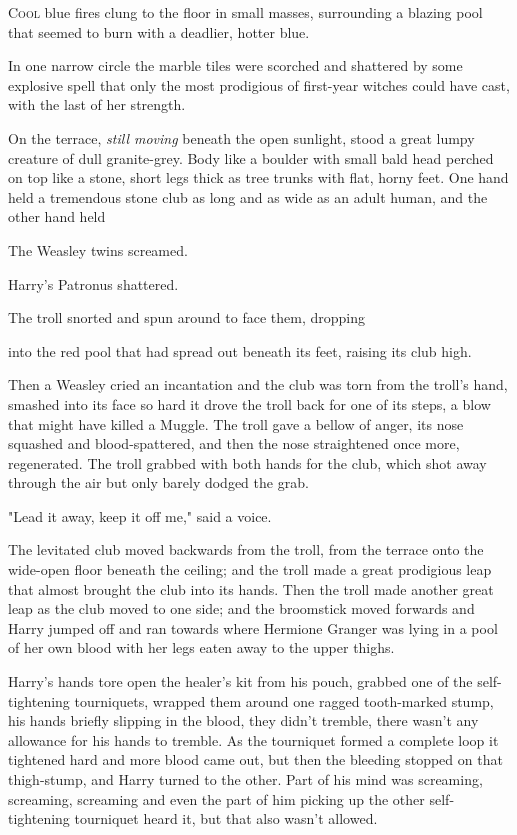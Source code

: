 
\lettrine{C}{ool} blue fires 
clung to the floor in small masses, surrounding a blazing pool that seemed to 
burn with a deadlier, hotter blue.

In one narrow circle the marble tiles were scorched and shattered by some 
explosive spell that only the most prodigious of first-year witches could have 
cast, with the last of her strength.

On the terrace, \emph{still moving} beneath the open sunlight, stood a great 
lumpy creature of dull granite-grey. Body like a boulder with small bald head 
perched on top like a stone, short legs thick as tree trunks with flat, horny 
feet. One hand held a tremendous stone club as long and as wide as an adult 
human, and the other hand held

The Weasley twins screamed.

Harry's Patronus shattered.

The troll snorted and spun around to face them, dropping

into the red pool that had spread out beneath its feet, raising its club high.

Then a Weasley cried an incantation and the club was torn from the troll's 
hand, smashed into its face so hard it drove the troll back for one of its 
steps, a blow that might have killed a Muggle. The troll gave a bellow of 
anger, its nose squashed and blood-spattered, and then the nose straightened 
once more, regenerated. The troll grabbed with both hands for the club, which 
shot away through the air but only barely dodged the grab.

"Lead it away, keep it off me," said a voice.

The levitated club moved backwards from the troll, from the terrace onto the 
wide-open floor beneath the ceiling; and the troll made a great prodigious leap 
that almost brought the club into its hands. Then the troll made another great 
leap as the club moved to one side; and the broomstick moved forwards and Harry 
jumped off and ran towards where Hermione Granger was lying in a pool of her 
own blood with her legs eaten away to the upper thighs.

Harry's hands tore open the healer's kit from his pouch, grabbed one of the 
self-tightening tourniquets, wrapped them around one ragged tooth-marked stump, 
his hands briefly slipping in the blood, they didn't tremble, there wasn't any 
allowance for his hands to tremble. As the tourniquet formed a complete loop it 
tightened hard and more blood came out, but then the bleeding stopped on that 
thigh-stump, and Harry turned to the other. Part of his mind was screaming, 
screaming, screaming and even the part of him picking up the other 
self-tightening tourniquet heard it, but that also wasn't allowed.

